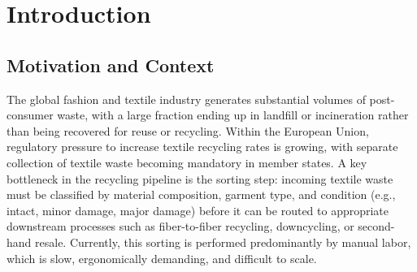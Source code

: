 \chapter{Introduction}\label{ch:introduction}


\section{Motivation and Context}

The global fashion and textile industry generates substantial volumes of post-consumer waste, with a large fraction ending up in landfill or incineration rather than being recovered for reuse or recycling.
Within the European Union, regulatory pressure to increase textile recycling rates is growing, with separate collection of textile waste becoming mandatory in member states.
A key bottleneck in the recycling pipeline is the sorting step: incoming textile waste must be classified by material composition, garment type, and condition (e.g., intact, minor damage, major damage) before it can be routed to appropriate downstream processes such as fiber-to-fiber recycling, downcycling, or second-hand resale. Currently, this sorting is performed predominantly by manual labor, which is slow, ergonomically demanding, and difficult to scale.

